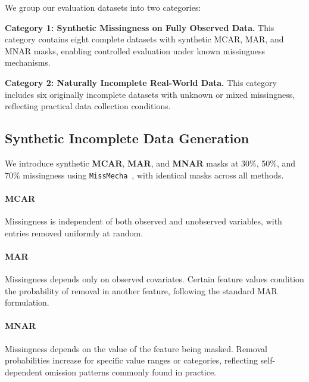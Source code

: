 \documentclass[times, review, 10pt]{elsarticle}
\begin{document}
We group our evaluation datasets into two categories:

\textbf{Category 1: Synthetic Missingness on Fully Observed Data.}
This category contains eight complete datasets with synthetic MCAR, MAR, and
MNAR masks, enabling controlled evaluation under known missingness mechanisms.

\textbf{Category 2: Naturally Incomplete Real-World Data.}
This category includes six originally incomplete datasets with unknown or mixed
missingness, reflecting practical data collection conditions.





\subsection{Synthetic Incomplete Data Generation}

We introduce synthetic \textbf{MCAR}, \textbf{MAR}, and \textbf{MNAR} masks at
30\%, 50\%, and 70\% missingness using \texttt{MissMecha}~\cite{missmecha},
with identical masks across all methods.

\paragraph*{MCAR}
Missingness is independent of both observed and unobserved variables, with
entries removed uniformly at random.

\paragraph*{MAR}
Missingness depends only on observed covariates. Certain feature values
condition the probability of removal in another feature, following the
standard MAR formulation.

\paragraph*{MNAR}
Missingness depends on the value of the feature being masked. Removal
probabilities increase for specific value ranges or categories, reflecting
self-dependent omission patterns commonly found in practice.
\end{document}

